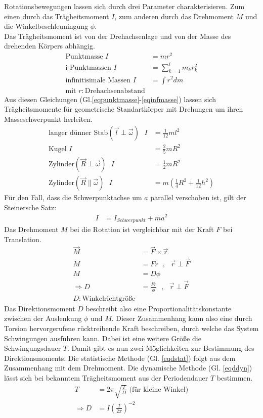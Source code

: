 Rotationsbewegungen lassen sich durch drei Parameter charakterisieren.
Zum einen durch das Trägheitsmoment $I$, zum anderen durch das Drehmoment $M$ und
die Winkelbeschleuningung $\ddot \phi$.\\
Das Trägheitsmoment ist von der Drehachsenlage und von der Masse des drehenden Körpers abhängig.
 \begin{align}
	\text{Punktmasse } I&=m r^2 \label{eqpunktmasse}\\
	\text{i Punktmassen } I&=\sum_{k=1}^i m_k r_k^2 \\
	\text{infinitisimale Massen } I&=\int r^2 dm \label{eqinfmasse}\\
	\text{mit } r: \text{Drehachsenabstand} \nonumber
 \end{align}
 Aus diesen Gleichungen (Gl.\ref{eqpunktmasse}-\ref{eqinfmasse}) lassen sich Trägheitsmomente
 für geometrische Standartkörper mit Drehungen um ihren Masseschwerpunkt herleiten.
 \begin{align}
	\text{langer dünner Stab}(\vec l \perp \vec \omega) \text{  } I&=\frac{1}{12} m l^2 \\
	\text{Kugel } I&=\frac{2}{5} m R^2 \label{eqkugel}\\
	\text{Zylinder} (\vec R \perp \vec \omega) \text{  } I&=\frac{1}{2} m R^2 \label{eqzylsenk}\\
	\text{Zylinder} (\vec R \| \vec \omega) \text{  } I&=m (\frac{1}{4} R^2 + \frac{1}{12} h^2) \label{eqzylpar}
 \end{align}
 Für den Fall, dass die Schwerpunktachse um $a$ parallel verschoben ist, gilt der Steinersche Satz:
 \begin{align}
	I&=I_{Schwerpunkt} + m a^2
	\label{eqsteiner}
 \end{align}
 Das Drehmoment $M$ bei die Rotation ist vergleichbar mit der Kraft $F$ bei Translation.
 \begin{align}
	\vec M &= \vec F \times \vec r \\
	M &= F  r\text{  },\text{  }\vec r \perp \vec F\\
	M&=D \phi\\
	\Rightarrow D&=\frac{F r}{\phi} \text{  },\text{  } \vec r \perp \vec F \label{eqdstat}\\
	D: \text{Winkelrichtgröße} \nonumber
 \end{align}
 Das Direktionsmoment $D$ beschreibt also eine Proportionalitätskonstante zwischen der
 Auslenkung $\phi$ und $M$. Dieser Zusammenhang kann also eine durch Torsion hervorgerufene
 rücktreibende Kraft beschreiben, durch welche das System Schwingungen ausführen kann.
 Dabei ist eine weitere Größe die Schwingungsdauer $T$. Damit gibt es nun zwei Möglichkeiten
 zur Bestimmung des Direktionsmoments. Die statistische Methode (Gl. \ref{eqdstat}) folgt aus dem 
 Zusammenhang mit dem Drehmoment. Die dynamische Methode (Gl. \ref{eqddyn}) lässt sich bei bekanntem
 Trägheitsmoment aus der Periodendauer $T$ bestimmen.
\begin{align}
	T&=2\pi\sqrt{\frac{I}{D}} \text{ (für kleine Winkel)} \label{eqti}\\
	\Rightarrow D&=I(\frac{T}{2\pi})^{-2} \label{eqddyn}
\end{align}
